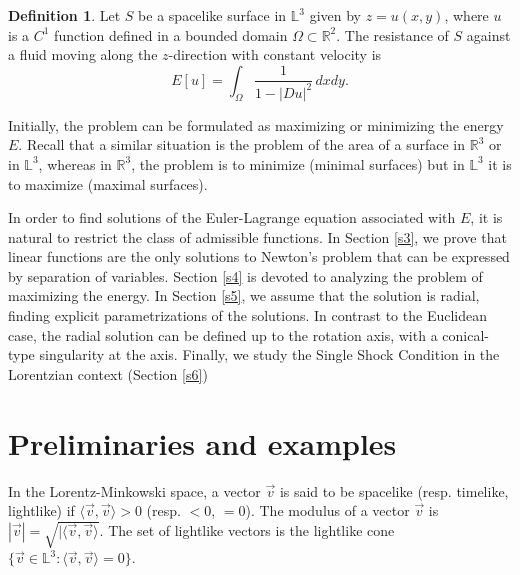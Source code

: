 \documentclass[a4paper,12pt]{amsart}
\theoremstyle{definition}
\newtheorem{definition}[theorem]{Definition}
\def\r{\mathbb R}
\def\l{\mathbb L}
\begin{document}
 \begin{definition}Let $S$ be a spacelike surface in $\l^3$ given by $z=u(x,y)$, where $u$ is a $C^1$ function defined in  a bounded domain $\Omega\subset\r^2$. The resistance of $S$ against a fluid   moving along the $z$-direction with constant velocity is 
 \begin{equation}\label{eq1}
 E[u]=\int_\Omega \frac{1}{1-|Du|^2}\, dxdy.
 \end{equation}
 \end{definition}
 
 Initially, the problem can be formulated as maximizing or minimizing the energy $E$. Recall that a similar situation is the problem of the area of a surface in $\r^3$ or in $\l^3$, whereas in $\r^3$, the problem is to minimize (minimal surfaces) but in $\l^3$ it is to maximize (maximal surfaces). 
 
 In order to find solutions of the Euler-Lagrange equation associated with $E$, it is natural to restrict the class of admissible functions.  In Section \ref{s3}, we prove that linear functions are the only  solutions to Newton's problem that can be expressed by separation of variables. Section \ref{s4} is devoted to analyzing the problem of maximizing the energy. In Section \ref{s5}, we assume that the solution is radial, finding explicit parametrizations of the solutions. In contrast to the Euclidean case, the radial solution can be defined up to the rotation axis,  with a conical-type singularity at the axis. Finally, we study the Single Shock Condition in the Lorentzian context (Section \ref{s6})
  
\section{Preliminaries and examples}\label{sec2}

In the Lorentz-Minkowski space, a vector $\vec{v}$ is said to be  spacelike (resp. timelike, lightlike) if $\langle \vec{v},\vec{v}\rangle>0$ (resp. $<0$, $=0$). The modulus of a vector $\vec{v}$ is $|\vec{v}|=\sqrt{|\langle \vec{v},\vec{v}\rangle}$. The set of   lightlike vectors is the lightlike cone $\{\vec{v}\in\l^3:\langle \vec{v},\vec{v}\rangle=0\}$. 
\end{document}
